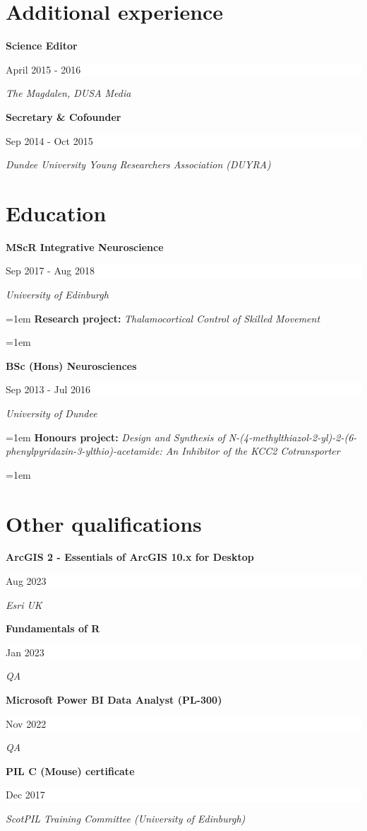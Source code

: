 \documentclass[paper=a4,fontsize=11pt]{scrartcl}
\newcommand{\sepspace}{\vspace*{1em}}
\newcommand{\ExperienceEntry}[5]{ %
		\noindent \textbf{#1} \hfill %
		\colorbox{White}{
            \parbox{9em}{
			\hfill\color{Black}#2}} \par %
		\noindent \textit{#3} \par %
		\noindent\hangindent=1em\hangafter=0 \small #4 %
		\normalsize \par
		\hangindent=1em\hangafter=1 \small #5 \par} %
\newcommand{\ShortEntry}[3]{ %
		\noindent \textbf{#1} \hfill %
		\colorbox{White}{
            \parbox{9em}{
			\hfill\color{Black}#2}} \par %
		\noindent \textit{#3} \par} %
\begin{document}
\section*{Additional experience}

\ShortEntry{Science Editor}{April 2015 - 2016}{The Magdalen, DUSA Media}
\sepspace

\ShortEntry{Secretary \& Cofounder}{Sep 2014 - Oct 2015}{Dundee University Young Researchers Association (DUYRA)}


\section*{Education}

\ExperienceEntry{MScR Integrative Neuroscience}{Sep 2017 - Aug 2018}{University of Edinburgh}{\textbf{Research project:} \textit{Thalamocortical Control of Skilled Movement}}{}
\sepspace

\ExperienceEntry{BSc (Hons) Neurosciences}{Sep 2013 - Jul 2016}{University of Dundee}{\textbf{Honours project:} \textit{Design and Synthesis of N-(4-methylthiazol-2-yl)-2-(6-phenylpyridazin-3-ylthio)-acetamide: An Inhibitor of the KCC2 Cotransporter}}{}
\sepspace



\section*{Other qualifications}
\ShortEntry{ArcGIS 2 - Essentials of ArcGIS 10.x for Desktop}{Aug 2023}{Esri UK}
\sepspace

\ShortEntry{Fundamentals of R}{Jan 2023}{QA}
\sepspace

\ShortEntry{Microsoft Power BI Data Analyst (PL-300)}{Nov 2022}{QA}
\sepspace

\ShortEntry{PIL C (Mouse) certificate}{Dec 2017}{ScotPIL Training Committee (University of Edinburgh)}
\sepspace
\end{document}

